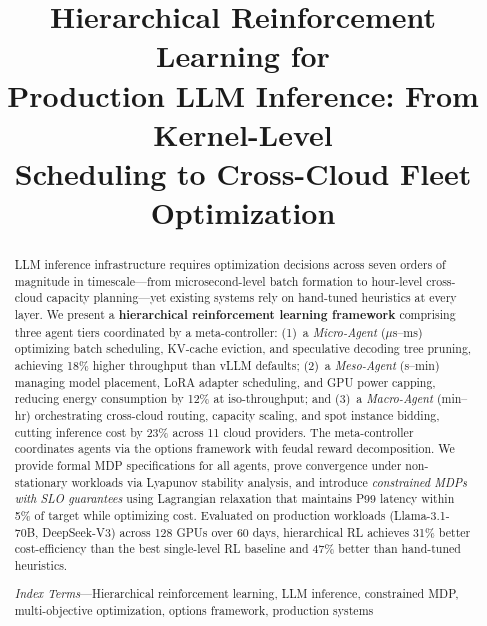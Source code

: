 \documentclass[conference,10pt]{IEEEtran}
\begin{document}
\title{Hierarchical Reinforcement Learning for\\Production LLM Inference: From Kernel-Level\\Scheduling to Cross-Cloud Fleet Optimization}
\author{
}
\maketitle
\begin{abstract}
LLM inference infrastructure requires optimization decisions across seven orders of magnitude in timescale---from microsecond-level batch formation to hour-level cross-cloud capacity planning---yet existing systems rely on hand-tuned heuristics at every layer. We present a \textbf{hierarchical reinforcement learning framework} comprising three agent tiers coordinated by a meta-controller: (1)~a \emph{Micro-Agent} ($\mu$s--ms) optimizing batch scheduling, KV-cache eviction, and speculative decoding tree pruning, achieving 18\% higher throughput than vLLM defaults; (2)~a \emph{Meso-Agent} (s--min) managing model placement, LoRA adapter scheduling, and GPU power capping, reducing energy consumption by 12\% at iso-throughput; and (3)~a \emph{Macro-Agent} (min--hr) orchestrating cross-cloud routing, capacity scaling, and spot instance bidding, cutting inference cost by 23\% across 11 cloud providers. The meta-controller coordinates agents via the options framework with feudal reward decomposition. We provide formal MDP specifications for all agents, prove convergence under non-stationary workloads via Lyapunov stability analysis, and introduce \emph{constrained MDPs with SLO guarantees} using Lagrangian relaxation that maintains P99 latency within 5\% of target while optimizing cost. Evaluated on production workloads (Llama-3.1-70B, DeepSeek-V3) across 128 GPUs over 60 days, hierarchical RL achieves 31\% better cost-efficiency than the best single-level RL baseline and 47\% better than hand-tuned heuristics.

\emph{Index Terms}---Hierarchical reinforcement learning, LLM inference, constrained MDP, multi-objective optimization, options framework, production systems
\end{abstract}
\end{document}
